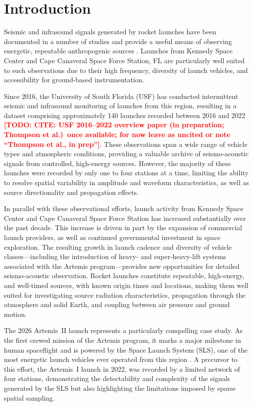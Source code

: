 \documentclass[]{seismica}
\newcommand{\todo}[1]{\textcolor{red}{\textbf{[TODO: #1]}}}
\begin{document}
\section{Introduction}

Seismic and infrasound signals generated by rocket launches have been
documented in a number of studies and provide a useful means of
observing energetic, repeatable anthropogenic sources
\citep[e.g.,][]{Kanamori1991,Hupe2019,Pilger2021}.
Launches from Kennedy Space Center and Cape Canaveral Space Force
Station, FL are particularly well suited to such observations due to
their high frequency, diversity of launch vehicles, and accessibility
for ground-based instrumentation.

Since 2016, the University of South Florida (USF) has conducted
intermittent seismic and infrasound monitoring of launches from this
region, resulting in a dataset comprising approximately 140 launches
recorded between 2016 and 2022 \todo{CITE: USF 2016--2022 overview
paper (in preparation; Thompson et al.)\ once available; for now
leave as uncited or note ``Thompson et al., in prep''}. These observations span a wide range of vehicle types and
atmospheric conditions, providing a valuable archive of seismo-acoustic
signals from controlled, high-energy sources. However, the majority of
these launches were recorded by only one to four stations at a time,
limiting the ability to resolve spatial variability in amplitude and
waveform characteristics, as well as source directionality and
propagation effects.

In parallel with these observational efforts, launch activity from
Kennedy Space Center and Cape Canaveral Space Force Station has
increased substantially over the past decade. This increase is driven in
part by the expansion of commercial launch providers, as well as
continued governmental investment in space exploration. The resulting
growth in launch cadence and diversity of vehicle classes---including
the introduction of heavy- and super-heavy-lift systems associated with
the Artemis program---provides new opportunities for detailed
seismo-acoustic observation. Rocket launches constitute repeatable,
high-energy, and well-timed sources, with known origin times and
locations, making them well suited for investigating source radiation
characteristics, propagation through the atmosphere and solid Earth, and
coupling between air pressure and ground motion.

The 2026 Artemis~II launch represents a particularly compelling case
study. As the first crewed mission of the Artemis program, it marks a
major milestone in human spaceflight and is powered by the Space Launch
System (SLS), one of the most energetic launch vehicles ever operated
from this region \citep{NASA_SLS,Sutton2017}. A precursor to this effort, the Artemis~I launch in 2022,
was recorded by a limited network of four stations, demonstrating the
detectability and complexity of the signals generated by the SLS but
also highlighting the limitations imposed by sparse spatial sampling.
\end{document}
